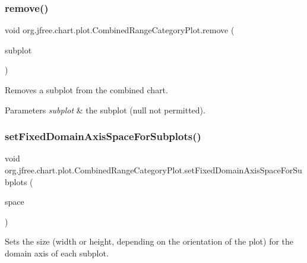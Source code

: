 \subsubsection{\texorpdfstring{remove()}{remove()}}
{\footnotesize\ttfamily void org.\+jfree.\+chart.\+plot.\+Combined\+Range\+Category\+Plot.\+remove (\begin{DoxyParamCaption}\item[{\mbox{\hyperlink{classorg_1_1jfree_1_1chart_1_1plot_1_1_category_plot}{Category\+Plot}}}]{subplot }\end{DoxyParamCaption})}

Removes a subplot from the combined chart.


\begin{DoxyParams}{Parameters}
{\em subplot} & the subplot ({\ttfamily null} not permitted). \\
\hline
\end{DoxyParams}
\mbox{\label{classorg_1_1jfree_1_1chart_1_1plot_1_1_combined_range_category_plot_a6916ffb761ec591261283a2af43a5d61}} 
\subsubsection{\texorpdfstring{set\+Fixed\+Domain\+Axis\+Space\+For\+Subplots()}{setFixedDomainAxisSpaceForSubplots()}}
{\footnotesize\ttfamily void org.\+jfree.\+chart.\+plot.\+Combined\+Range\+Category\+Plot.\+set\+Fixed\+Domain\+Axis\+Space\+For\+Subplots (\begin{DoxyParamCaption}\item[{\mbox{\hyperlink{classorg_1_1jfree_1_1chart_1_1axis_1_1_axis_space}{Axis\+Space}}}]{space }\end{DoxyParamCaption})\hspace{0.3cm}{\ttfamily [protected]}}

Sets the size (width or height, depending on the orientation of the plot) for the domain axis of each subplot.


